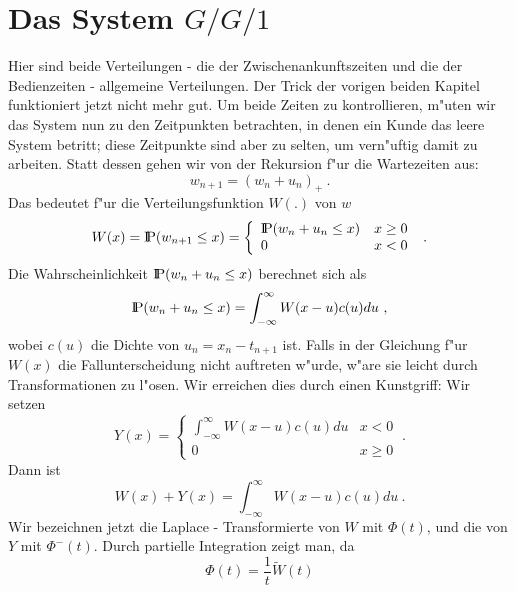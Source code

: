 \section{Das System $G/G/1$}
Hier sind beide Verteilungen - die der Zwischenankunftszeiten und die der
Bedienzeiten - allgemeine Verteilungen. Der Trick der vorigen beiden
Kapitel funktioniert jetzt nicht mehr gut. Um beide Zeiten zu
kontrollieren, m"u\3ten wir das System nun zu den Zeitpunkten betrachten,
in denen ein Kunde das leere System betritt; diese Zeitpunkte sind aber zu
selten, um vern"uftig damit zu arbeiten. Statt dessen gehen wir von der
Rekursion f"ur die Wartezeiten aus:
\begin{displaymath}
w_{n+1} = (w_{n} + u_{n})_{+} ~.
\end{displaymath}
Das bedeutet f"ur die Verteilungsfunktion $W(.)$ von $w$
\begin{displaymath}
W(x) = {\rm I\kern-0.2em P} (w_{n+1} \leq x) = \left\{
\begin{array}{lc}
{\rm I\kern-0.2em P} (w_{n} + u_{n} \leq x) & x \geq 0 \\
0 & x < 0 
\end{array} \right. ~.
\end{displaymath}
Die Wahrscheinlichkeit ${\rm I\kern-0.2em P} (w_{n}+ u_{n} \leq x)$ berechnet sich als
\begin{displaymath}
{\rm I\kern-0.2em P} (w_{n} + u_{n} \leq x) = \int_{- \infty}^{\infty} W(x-u) c(u) du ~,
\end{displaymath}
wobei $c(u)$ die Dichte von $u_{n} = x_{n} - t_{n+1}$ ist. Falls in der
Gleichung f"ur $W(x)$ die Fallunterscheidung nicht auftreten w"urde, w"are
sie leicht durch Transformationen zu l"osen. Wir erreichen dies durch
einen Kunstgriff: Wir setzen
\begin{displaymath}
Y(x) = \left\{
\begin{array}{lc}
\int_{- \infty}^{\infty} W(x-u)c(u) du &  x< 0 \\
0 &  x \geq 0
\end{array} \right. ~.
\end{displaymath}
Dann ist 
\begin{displaymath}
W(x) + Y(x) = \int_{-\infty}^{\infty} W(x-u) c(u) du ~.
\end{displaymath}
Wir bezeichnen jetzt die Laplace - Transformierte von $W$ mit $\Phi (t)$,
und die von $Y$ mit $\Phi^{-}(t)$. Durch partielle Integration zeigt man,
da\3
\begin{displaymath}
\Phi (t) = \frac{1}{t} \tilde W(t)
\end{displaymath}
